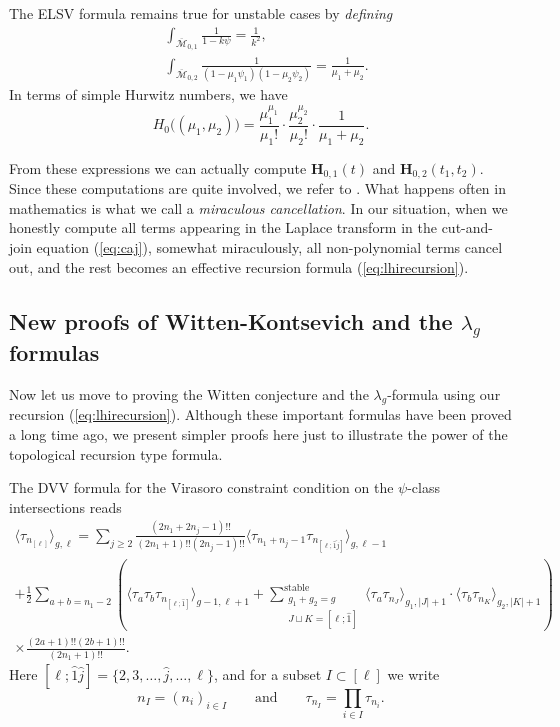 \documentclass{amsart}
\theoremstyle{definition}
\numberwithin{equation}{section}
\numberwithin{figure}{section}
\newcommand{\cM}{{\mathcal{M}}}
\newcommand{\la}{{\langle}}
\newcommand{\ra}{{\rangle}}
\begin{document}
The ELSV formula remains true for unstable cases
by \emph{defining}
\begin{align}
\label{eq:01Hodge}
&\int_{\overline{\cM}_{0,1}} \frac{1}{1-k\psi}
=\frac{1}{k^2},\\
\label{eq:02Hodge}
&\int_{\overline{\cM}_{0,2}} 
\frac{1}{(1-\mu_1\psi_1)(1-\mu_2\psi_2)}
=\frac{1}{\mu_1+\mu_2}.
\end{align}
In terms of simple Hurwitz numbers,
we have
$$
H_0\big((\mu_1,\mu_2)\big)
=\frac{\mu_1^{\mu_1}}{\mu_1 !}\cdot
\frac{\mu_2^{\mu_2}}{\mu_2 !}\cdot
\frac{1}{\mu_1+\mu_2}.
$$


From these expressions we can actually compute
$\mathbf{H}_{0,1}(t)$ and $\mathbf{H}_{0,2}(t_1,t_2)$. Since these
computations are quite involved, we refer to 
\cite{EMS,MZ}. What happens often in mathematics
is what we call a \emph{miraculous cancellation}.
In our situation, when we honestly compute
all terms appearing in the Laplace transform
in the cut-and-join equation (\ref{eq:caj}),
somewhat miraculously, all non-polynomial
terms cancel out, and the rest becomes an
effective recursion formula (\ref{eq:lhirecursion}).






\subsection{New proofs of Witten-Kontsevich 
 and the $\lambda_g$ formulas}

Now let us move to proving the Witten conjecture
and the $\lambda_g$-formula using our 
recursion (\ref{eq:lhirecursion}). Although 
these important formulas have been proved a long
time ago, we present simpler proofs here just to 
illustrate the power of the topological recursion type formula.


The DVV formula for the
Virasoro constraint condition on the $\psi$-class
intersections  reads 
\begin{multline}
\label{eq:DVV}
\la \tau_{n_{[\ell]}}\ra _{g,\ell}=
\sum_{j\ge 2} 
\frac{(2n_1+2n_j-1)!!}{(2n_1+1)!! (2n_j -1)!!}
 \la \tau_{n_1+n_j-1}
 \tau_{n_{[\ell;\hat{1}\hat{j}]}}
\ra _{g,\ell-1}
\\
+
\frac{1}{2} \sum_{a+b=n_1-2}
\left(
\la \tau_a\tau_b\tau_{n_{[\ell;\hat{1}]}}
\ra _{g-1,\ell+1}
+
\sum_{\substack{g_1+g_2=g\\
J\sqcup K= [\ell;\hat{1}]}} ^{
\text{stable}}
\la \tau_a\tau_{n_J}\ra _{g_1,|J|+1}\cdot
\la \tau_b\tau_{n_K}\ra _{g_2,|K|+1}
\right)
\\
\times
\frac{(2a+1)!!(2b+1)!!}{(2n_1+1)!!}.
\end{multline}
Here $[\ell;\hat{1}\hat{j}]
=\{2,3,\dots,\hat{j},\dots,\ell\}$, and
for a subset $I\subset [\ell]$ we write
$$
n_I = (n_i)_{i\in I}\qquad{\text{and}}\qquad
\tau_{n_I}=\prod_{i\in I}\tau_{n_i}.
$$
\end{document}
